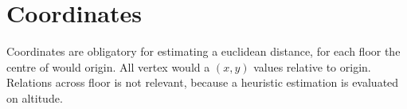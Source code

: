 \section{Coordinates}

Coordinates are obligatory for estimating a euclidean distance, for each floor the centre of would origin. All vertex would a $(x, y)$ values relative to origin. Relations across floor is not relevant, because a heuristic estimation is evaluated on altitude.